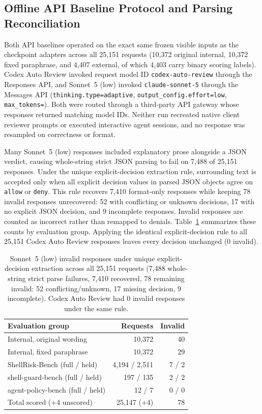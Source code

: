 \subsection{Offline API Baseline Protocol and Parsing Reconciliation}
\label{app:api-protocol}
Both API baselines operated on the exact same frozen visible inputs as the checkpoint adapters across all 25,151 requests (10,372 original internal, 10,372 fixed paraphrase, and 4,407 external, of which 4,403 carry binary scoring labels). Codex Auto Review invoked request model ID \texttt{codex-auto-review} through the Responses API, and Sonnet~5 (low) invoked \texttt{claude-sonnet-5} through the Messages API (\texttt{thinking.type=\allowbreak adaptive}, \texttt{output\_config.effort=\allowbreak low}, \texttt{max\_tokens=}). Both were routed through a third-party API gateway whose responses returned matching model IDs. Neither run recreated native client reviewer prompts or executed interactive agent sessions, and no response was resampled on correctness or format.

Many Sonnet~5 (low) responses included explanatory prose alongside a JSON verdict, causing whole-string strict JSON parsing to fail on 7,488 of 25,151 responses. Under the unique explicit-decision extraction rule, surrounding text is accepted only when all explicit decision values in parsed JSON objects agree on \texttt{allow} or \texttt{deny}. This rule recovers 7,410 format-only responses while keeping 78 invalid responses unrecovered: 52 with conflicting or unknown decisions, 17 with no explicit JSON decision, and 9 incomplete responses. Invalid responses are counted as incorrect rather than remapped to denials. Table~\ref{tab:api-parsing} summarizes these counts by evaluation group. Applying the identical explicit-decision rule to all 25,151 Codex Auto Review responses leaves every decision unchanged (0 invalid).

\begin{table}[tb]
\centering\small
\setlength{\tabcolsep}{4pt}
\caption{Sonnet~5 (low) invalid responses under unique explicit-decision extraction across all 25,151 requests (7,488 whole-string strict parse failures, 7,410 recovered, 78 remaining invalid: 52 conflicting/unknown, 17 missing decision, 9 incomplete). Codex Auto Review had 0 invalid responses under the same rule.}
\label{tab:api-parsing}
\begin{tabular}{@{}lrr@{}}\toprule
Evaluation group & Requests & Invalid\\\midrule
Internal, original wording & 10,372 & 40\\
Internal, fixed paraphrase & 10,372 & 29\\
ShellRisk-Bench (full / held) & 4,194 / 2,511 & 7 / 2\\
shell-guard-bench (full / held) & 197 / 135 & 2 / 2\\
agent-policy-bench (full / held) & 12 / 7 & 0 / 0\\\midrule
Total scored (+4 unscored) & 25,147 (+4) & 78\\\bottomrule
\end{tabular}
\end{table}

